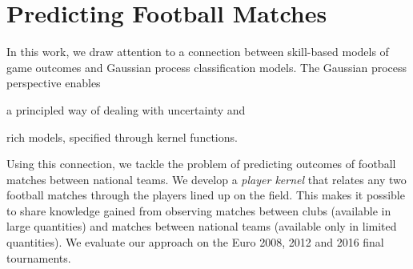 \chapter{Predicting Football Matches}
\label{ch:playerkern}

In this work, we draw attention to a connection between skill-based models of game outcomes and Gaussian process classification models.
The Gaussian process perspective enables
\begin{enuminline}
\item a principled way of dealing with uncertainty and
\item rich models, specified through kernel functions.
\end{enuminline}
Using this connection, we tackle the problem of predicting outcomes of football matches between national teams.
We develop a \emph{player kernel} that relates any two football matches through the players lined up on the field.
This makes it possible to share knowledge gained from observing matches between clubs (available in large quantities) and matches between national teams (available only in limited quantities).
We evaluate our approach on the Euro 2008, 2012 and 2016 final tournaments.





